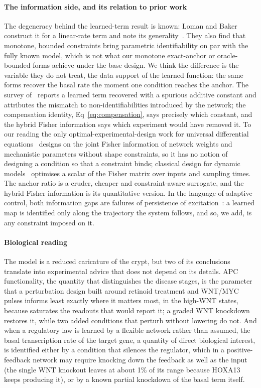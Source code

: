 \paragraph{The information side, and its relation to prior work} The
degeneracy behind the learned-term result is known: Loman and Baker construct
it for a linear-rate term and note its generality~\citep{loman2025identifiability}.
They also find that monotone, bounded constraints bring parametric
identifiability on par with the fully known model, which is not what our
monotone exact-anchor or oracle-bounded forms achieve under the base design. We
think the difference is the variable they do not treat, the data support of
the learned function: the same forms recover the basal rate the moment one
condition reaches the anchor. The survey of~\citet{philipps2025ude} reports a
learned term recovered with a spurious additive constant and attributes the
mismatch to non-identifiabilities introduced by the network; the compensation
identity, Eq~\eqref{eq:compensation}, says precisely which constant, and the
hybrid Fisher information says which experiment would have removed it. To our
reading the only optimal-experimental-design work for universal differential
equations~\citep{plate2024oed} designs on the joint Fisher information of
network weights and mechanistic parameters without shape constraints, so it has
no notion of designing a condition so that a constraint binds; classical
design for dynamic models~\citep{kreutz2009design,bandara2009oed,apgar2010sloppy,transtrum2012oed,liepe2013maximizing}
optimises a scalar of the Fisher matrix over inputs and sampling times. The
anchor ratio is a cruder, cheaper and constraint-aware surrogate, and the
hybrid Fisher information is its quantitative version. In the language of
adaptive control, both information gaps are failures of persistence of
excitation~\citep{sastry1989adaptive,wang2006learning}: a learned map is
identified only along the trajectory the system follows, and so, we add, is any
constraint imposed on it.

\paragraph{Biological reading} The model is a reduced caricature of the crypt,
but two of its conclusions translate into experimental advice that does not
depend on its details. APC functionality, the quantity that distinguishes the
disease stages, is the parameter that a perturbation design built around
retinoid treatment and WNT/MYC pulses informs least exactly where it matters
most, in the high-WNT states, because \bcat{} saturates the readouts that would
report it; a graded WNT knockdown restores it, while two added conditions that
perturb without lowering \bcat{} do not. And when a regulatory law is learned by a flexible network
rather than assumed, the basal transcription rate of the target gene, a
quantity of direct biological interest, is identified either by a condition that
silences the regulator, which in a positive-feedback network may require
knocking down the feedback as well as the input (the single WNT knockout leaves
\bcat{} at about 1\% of its range because HOXA13 keeps producing it), or by a known
partial knockdown of the basal term itself.

